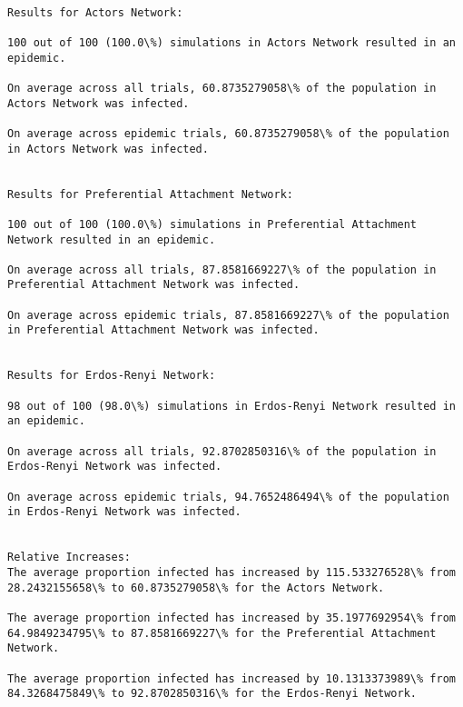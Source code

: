 \documentclass[11pt]{article}
\begin{document}
    \begin{Verbatim}[commandchars=\\\{\}]

Results for Actors Network:

100 out of 100 (100.0\%) simulations in Actors Network resulted in an epidemic.

On average across all trials, 60.8735279058\% of the population in Actors Network was infected.

On average across epidemic trials, 60.8735279058\% of the population in Actors Network was infected.


Results for Preferential Attachment Network:

100 out of 100 (100.0\%) simulations in Preferential Attachment Network resulted in an epidemic.

On average across all trials, 87.8581669227\% of the population in Preferential Attachment Network was infected.

On average across epidemic trials, 87.8581669227\% of the population in Preferential Attachment Network was infected.


Results for Erdos-Renyi Network:

98 out of 100 (98.0\%) simulations in Erdos-Renyi Network resulted in an epidemic.

On average across all trials, 92.8702850316\% of the population in Erdos-Renyi Network was infected.

On average across epidemic trials, 94.7652486494\% of the population in Erdos-Renyi Network was infected.


Relative Increases:
The average proportion infected has increased by 115.533276528\% from 28.2432155658\% to 60.8735279058\% for the Actors Network.

The average proportion infected has increased by 35.1977692954\% from 64.9849234795\% to 87.8581669227\% for the Preferential Attachment Network.

The average proportion infected has increased by 10.1313373989\% from 84.3268475849\% to 92.8702850316\% for the Erdos-Renyi Network.


    \end{Verbatim}
\end{document}

